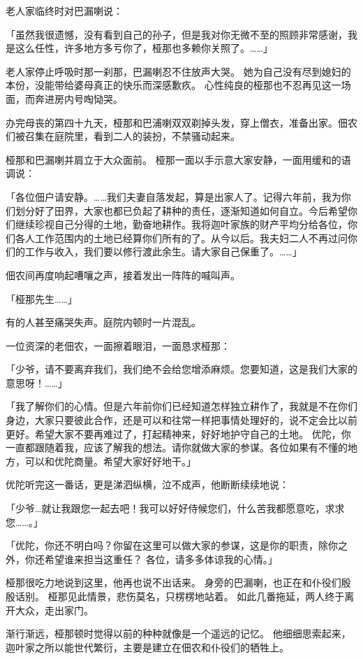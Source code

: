 \documentclass[twoside,openany]{book}
\begin{document}
老人家临终时对巴漏喇说：

「虽然我很遗憾，没有看到自己的孙子，但是我对你无微不至的照顾非常感谢，我是这么任性，许多地方多亏你了，桠那也多赖你关照了。……」

老人家停止呼吸时那一刹那，巴漏喇忍不住放声大哭。
她为自己没有尽到媳妇的本份，没能带给婆母真正的快乐而深感歉疚。
心性纯良的桠那也不忍再见这一场面，而奔进房内号啕恸哭。

办完母丧的第四十九天，桠那和巴浦喇双双剃掉头发，穿上僧衣，准备出家。佃农们被召集在庭院里，看到二人的装扮，不禁骚动起来。

桠那和巴漏喇并肩立于大众面前。
桠那一面以手示意大家安静，一面用缓和的语调说：

「各位佃户请安静。……我们夫妻自落发起，算是出家人了。记得六年前，我为你们划分好了田界，大家也都已负起了耕种的责任，逐渐知道如何自立。今后希望你们继续珍视自己分得的土地，勤奋地耕作。我将迦叶家族的财产平均分给各位，你们各人工作范围内的土地已经算你们所有的了。从今以后。我夫妇二人不再过问你们的工作与收入，我们要以修行渡此余生。请大家自己保重了。……」

佃农间再度响起嘈嚷之声，接着发出一阵阵的喊叫声。

「桠那先生……」

有的人甚至痛哭失声。庭院内顿时一片混乱。

一位资深的老佃农，一面擦着眼泪，一面恳求桠那：

「少爷，请不要离弃我们，我们绝不会给您增添麻烦。您要知道，这是我们大家的意思呀！……」

「我了解你们的心情。但是六年前你们已经知道怎样独立耕作了，我就是不在你们身边，大家只要彼此合作，还是可以和往常一样把事情处理好的，说不定会比以前更好。希望大家不要再难过了，打起精神来，好好地护守自己的土地。
优陀，你一直都跟随着我，应该了解我的想法。请你就做大家的参谋。各位如果有不懂的地方，可以和优陀商量。希望大家好好地干。」

优陀听完这一番话，更是涕泗纵横，泣不成声，他断断续续地说：

「少爷…就让我跟您一起去吧！我可以好好侍候您们，什么苦我都愿意吃，求求您……。」

「优陀，你还不明白吗？你留在这里可以做大家的参谋，这是你的职责，除你之外，你还希望谁来担当这重任？
各位，请多多体谅我的心情。」

桠那很吃力地说到这里，他再也说不出话来。
身旁的巴漏喇，也正在和仆役们殷殷话别。
桠那见此情景，悲伤莫名，只楞楞地站着。
如此几番拖延，两人终于离开大众，走出家门。

渐行渐远，桠那顿时觉得以前的种种就像是一个遥远的记忆。
他细细思索起来，迦叶家之所以能世代繁衍，主要是建立在佃农和仆役们的牺牲上。
\end{document}
